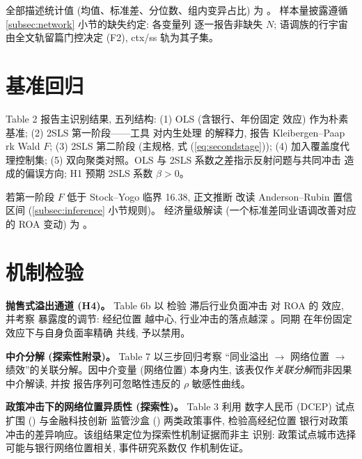 全部描述统计值 (均值、标准差、分位数、组内变异占比) 为
。
样本量披露遵循 \ref{subsec:network} 小节的缺失约定: 各变量列
逐一报告非缺失 $N$; 语调族的行宇宙由全文轨留篇门控决定 (F2),
ctx/ss 轨为其子集。

\section{基准回归}\label{sec:main}

Table 2 报告主识别结果, 五列结构: (1) OLS (含银行、年份固定
效应) 作为朴素基准; (2) 2SLS 第一阶段——工具
 对内生处理
 的解释力, 报告 Kleibergen--Paap
rk Wald $F$; (3) 2SLS 第二阶段 (主规格, 式
(\ref{eq:secondstage})); (4) 加入覆盖度代理控制集;
(5) 双向聚类对照。OLS 与 2SLS 系数之差指示反射问题与共同冲击
造成的偏误方向; H1 预期 2SLS 系数 $\beta > 0$。

 若第一阶段 $F$ 低于 Stock--Yogo 临界 16.38, 正文推断
改读 Anderson--Rubin 置信区间 (\ref{subsec:inference} 小节规则)。
经济量级解读 (一个标准差同业语调改善对应的 ROA 变动) 为
。

\section{机制检验}\label{sec:mech}

\textbf{抛售式溢出通道 (H4)。} Table 6b 以  检验
滞后行业负面冲击  对 ROA 的
效应, 并考察  暴露度的调节: 经纪位置
越中心, 行业冲击的落点越深
\parencite{duarte2021firesale,han2024brokerage}。同期
 在年份固定效应下与自身负面率精确
共线, 予以禁用。

\textbf{中介分解 (探索性附录)。} Table 7 以三步回归考察
``同业溢出 $\to$ 网络位置 $\to$ 绩效''的关联分解。因中介变量
(网络位置) 本身内生, 该表仅作\emph{关联分解}而非因果中介解读,
并按 \textcite{imai2010identification} 报告序列可忽略性违反的
$\rho$ 敏感性曲线。

\textbf{政策冲击下的网络位置异质性 (探索性)。} Table 3 利用
数字人民币 (DCEP) 试点扩围 () 与金融科技创新
监管沙盒 () 两类政策事件, 检验高经纪位置
银行对政策冲击的差异响应。该组结果定位为探索性机制证据而非主
识别: 政策试点城市选择可能与银行网络位置相关, 事件研究系数仅
作机制佐证。

